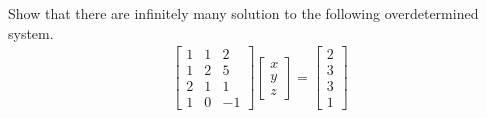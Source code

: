 \begin{exmp}
Show that there are infinitely many solution to the following overdetermined system.
\begin{align*}
\begin{bmatrix}
1 & 1 & 2 \\
1 & 2 & 5 \\
2 & 1 & 1 \\
1 & 0 & -1
\end{bmatrix}
\begin{bmatrix}
x \\
y \\ 
z
\end{bmatrix}
=
\begin{bmatrix}
2 \\
3 \\
3 \\
1
\end{bmatrix}   
\end{align*}
\end{exmp}
